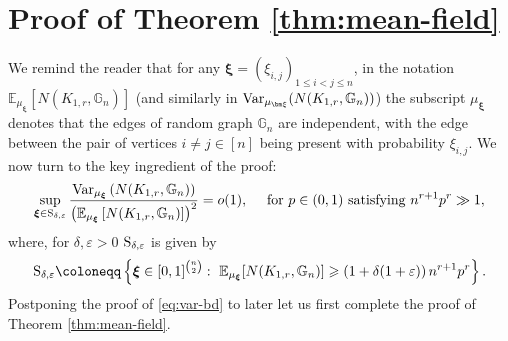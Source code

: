 \documentclass[a4paper,11pt,english,reqno]{amsart}
\numberwithin{equation}{section}
\renewcommand{\leq}{\leqslant}
\renewcommand{\geq}{\geqslant}
\newcommand{\E}{\mathbb{E}}
\newcommand{\G}{\mathbb{G}}
\newcommand{\tu}[1]{\textup{#1}}
\newcommand{\set}[1]{[\![#1]\!]}
\newcommand{\purple}[1]{{\color{purple} #1}}
\begin{document}
	
	
	
	
	
	
	
	
	
	
	
	
	
	
	
	
	
	
	
	
	
	
	
	
	
	\section{Proof of Theorem \ref{thm:mean-field}}
	\label{sec:mean_field}
	We remind the reader that for any ${\bm\xi} = (\xi_{i,j})_{1\leq i<j\leq n}$, in the notation $\E_{\mu_{\bm \xi}}[N(K_{1,r}, \G_n)]$ (and similarly in $\tu{Var}_{\mu_{\bm \xi}}(N(K_{1,r}, \G_n))$) the subscript $\mu_{\bm\xi}$ denotes that the edges of random graph $\G_{n}$ are independent, with the edge between the pair of vertices $i \ne j \in [n]$ being present with probability $\xi_{i,j}$. %
	We now turn to the key ingredient of the proof:
%	
	\begin{equation}\label{eq:var-bd}
		\sup_{\boldsymbol{\xi}\in \tu{S}_{\delta, \varepsilon}}\frac{\tu{Var}_{\mu_{\boldsymbol{\xi}}}\left(N(K_{1,r},\G_{n})\right)}{\left(\E_{\mu_{\boldsymbol{\xi}}}\left[N(K_{1,r}, \G_n)\right]\right)^{2}} = o(1), \quad \text{ for } p\in (0,1) \text{ satisfying } n^{r+1}p^{r}\gg1,
	\end{equation}
	{where, for $\delta, \varepsilon>0$ $\tu{S}_{\delta,\varepsilon}$ is given by}
	\begin{equation*}
		\tu{S}_{\delta,\varepsilon} \coloneqq \left\{\boldsymbol{\xi}\in [0,1]^{n\choose 2}:\ \E_{\mu_{\boldsymbol{\xi}}}[N(K_{1,r}, \G_{n})] \geq \left(1+\delta(1+\varepsilon)\right)n^{r+1}p^{r}\right\}.
	\end{equation*}
	Postponing the proof of \eqref{eq:var-bd} to later let us first complete the proof of Theorem \ref{thm:mean-field}.  
	
\end{document}
